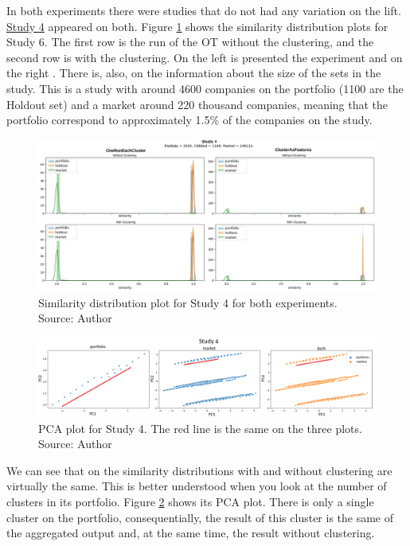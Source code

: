 In both experiments there were studies that do not had any variation on the lift. \underline{Study 4} appeared on both. Figure \ref{fig:study-4-comparsion} shows the similarity distribution plots for Study 6. The first row is the run of the OT without the clustering, and the second row is with the clustering. On the left is presented the \nameExperimentI{} experiment and on the right \nameExperimentII{}. There is, also, on the information about the size of the sets in the study. This is a study with around 4600 companies on the portfolio (1100 are the Holdout set) and a market around 220 thousand companies, meaning that the portfolio correspond to approximately 1.5\% of the companies on the study.

\begin{figure}[h]
   \centering
   \includegraphics[width=\linewidth]{fig/ch4-study-4-comparsion.jpg}
   \caption{Similarity distribution plot for Study 4 for both experiments. Source: Author}
   \label{fig:study-4-comparsion}
\end{figure}

\begin{figure}[h]
   \centering
   \includegraphics[width=\linewidth]{fig/ch4-study-4-pca-plot.png}
   \caption{PCA plot for Study 4. The red line is the same on the three plots. Source: Author}
   \label{fig:study-4-pca-plot}
\end{figure}

We can see that on \nameExperimentI{} the similarity distributions with and without clustering are virtually the same. This is better understood when you look at the number of clusters in its portfolio. Figure \ref{fig:study-4-pca-plot} shows its PCA plot. There is only a single cluster on the portfolio, consequentially, the result of this cluster is the same of the aggregated output and, at the same time, the result without clustering.


